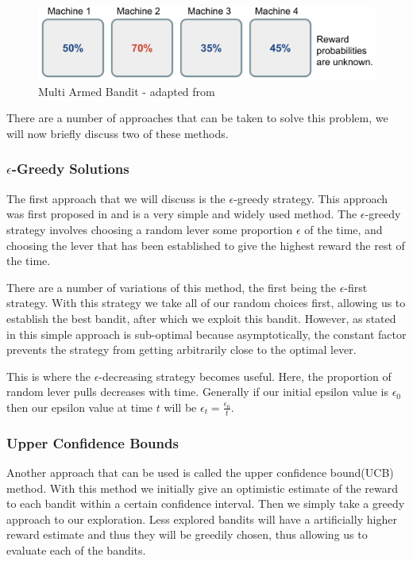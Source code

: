 \begin{figure}[ht]
    \includegraphics[scale=.25]{images/bandit.png}
    \caption{Multi Armed Bandit - adapted from\citep{weng2018multiarm}}
\end{figure}

There are a number of approaches that can be taken to solve this problem, we will now briefly discuss two of these
methods.

\subsubsection{$\epsilon$-Greedy Solutions}\label{subsec:eGreedy}
The first approach that we will discuss is the $\epsilon$-greedy strategy.
This approach was first proposed in\citep{watkins1989learning} and is a very simple and widely used method.
The $\epsilon$-greedy strategy involves choosing a random lever some proportion $\epsilon$ of the time, and
choosing the lever that has been established to give the highest reward the rest of the time.

There are a number of variations of this method, the first being the $\epsilon$-first strategy.
With this strategy we take all of our random choices first, allowing us to establish the best bandit,
after which we exploit this bandit.
However, as stated in\citep{vermorel2005multi} this simple approach is sub-optimal because asymptotically,
the constant factor prevents the strategy from getting arbitrarily close to
the optimal lever.

This is where the $\epsilon$-decreasing strategy becomes useful.
Here, the proportion of random lever pulls decreases with time.
Generally if our initial epsilon value is $\epsilon_0$ then our epsilon value at time $t$ will be
$\epsilon_t = \frac{\epsilon_0}{t}$.

\subsubsection{Upper Confidence Bounds}
Another approach that can be used is called the upper confidence bound(UCB) method.
With this method we initially give an optimistic estimate of the reward to each bandit within a certain
confidence interval.
Then we simply take a greedy approach to our exploration.
Less explored bandits will have a artificially higher reward estimate and thus they will be greedily chosen,
thus allowing us to evaluate each of the bandits.

